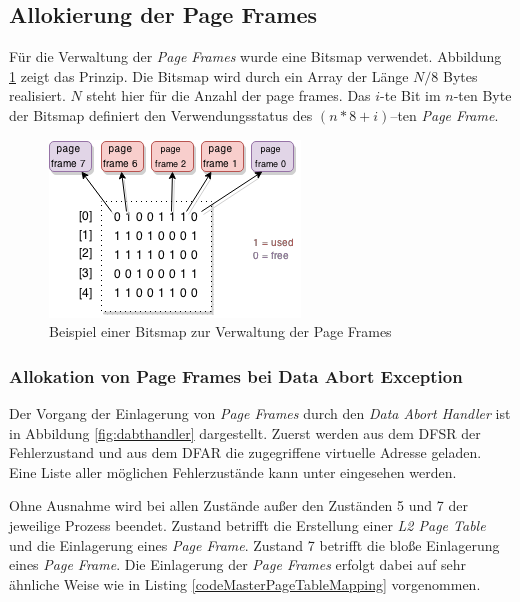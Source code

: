 

\subsection{Allokierung der Page Frames}

Für die Verwaltung der \textit{Page Frames} wurde eine Bitsmap verwendet. Abbildung \ref{fig:BitsMap} zeigt das Prinzip.
Die Bitsmap wird durch ein Array der Länge $N/8$ Bytes realisiert. $N$ steht hier für die Anzahl der page frames. Das $i$-te Bit im $n$-ten Byte der Bitsmap definiert den Verwendungsstatus des $(n*8 + i)$–ten \textit{Page Frame}.

\begin{figure}[H]
	\centering
	\includegraphics[scale=1]{chapters/mmu/figures/BitsMap}
	\caption{Beispiel einer Bitsmap zur Verwaltung der Page Frames}
	\label{fig:BitsMap}
\end{figure}

\subsubsection{Allokation von Page Frames bei Data Abort Exception}

Der Vorgang der Einlagerung von \textit{Page Frames} durch den \textit{Data Abort Handler} ist in Abbildung \ref{fig:dabthandler} dargestellt. Zuerst werden aus dem \ac{DFSR} der Fehlerzustand und aus dem \ac{DFAR} die zugegriffene virtuelle Adresse geladen. Eine Liste aller möglichen Fehlerzustände kann unter \cite[B3-1415]{ARM:ARM} eingesehen werden.

Ohne Ausnahme wird bei allen Zustände außer den Zuständen 5 und 7 der jeweilige Prozess beendet. Zustand betrifft die Erstellung einer \textit{L2 Page Table} und die Einlagerung eines \textit{Page Frame}. Zustand 7 betrifft die bloße Einlagerung eines \textit{Page Frame}. Die Einlagerung der \textit{Page Frames} erfolgt dabei auf sehr ähnliche Weise wie in Listing \ref{codeMasterPageTableMapping} vorgenommen.

